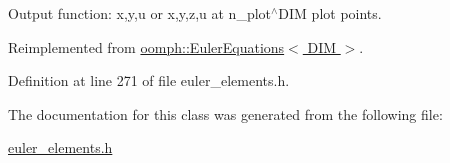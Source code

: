 Output function\+: x,y,u or x,y,z,u at n\+\_\+plot$^\wedge$\+D\+IM plot points. 



Reimplemented from \hyperlink{classoomph_1_1EulerEquations_a9d51d5bcc096341b6f73353d87def5b3}{oomph\+::\+Euler\+Equations$<$ D\+I\+M $>$}.



Definition at line 271 of file euler\+\_\+elements.\+h.



The documentation for this class was generated from the following file\+:\begin{DoxyCompactItemize}
\item 
\hyperlink{euler__elements_8h}{euler\+\_\+elements.\+h}\end{DoxyCompactItemize}
